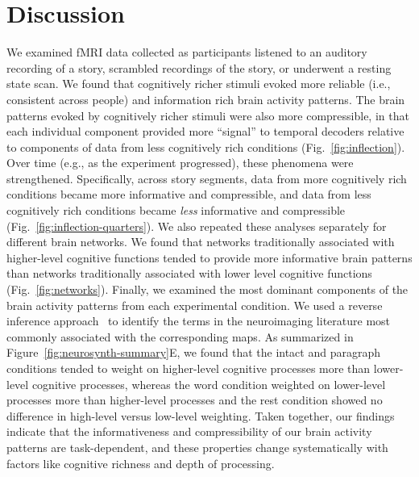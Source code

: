 \documentclass[english, 11pt]{article}
\begin{document}
\section*{Discussion}

We examined fMRI data collected as participants listened to an auditory
recording of a story, scrambled recordings of the story, or underwent a resting
state scan. We found that cognitively richer stimuli evoked more reliable
(i.e., consistent across people) and information rich brain activity patterns.
The brain patterns evoked by cognitively richer stimuli were also more
compressible, in that each individual component provided more ``signal'' to
temporal decoders relative to components of data from less cognitively rich
conditions (Fig.~\ref{fig:inflection}). Over time (e.g., as the experiment
progressed), these phenomena were strengthened. Specifically, across story
segments, data from more cognitively rich conditions became more informative
and compressible, and data from less cognitively rich conditions became
\textit{less} informative and compressible
(Fig.~\ref{fig:inflection-quarters}). We also repeated these analyses
separately for different brain networks. We found that networks traditionally
associated with higher-level cognitive functions tended to provide more
informative brain patterns than networks traditionally associated with lower
level cognitive functions (Fig.~\ref{fig:networks}). Finally, we examined the
most dominant components of the brain activity patterns from each experimental
condition. We used a reverse inference approach~\citep{RubiEtal17} to identify
the terms in the neuroimaging literature most commonly associated with the
corresponding maps. As summarized in Figure~\ref{fig:neurosynth-summary}E, we
found that the intact and paragraph conditions tended to weight on higher-level
cognitive processes more than lower-level cognitive processes, whereas the word
condition weighted on lower-level processes more than higher-level processes
and the rest condition showed no difference in high-level versus low-level
weighting. Taken together, our findings indicate that the informativeness and
compressibility of our brain activity patterns are task-dependent, and these
properties change systematically with factors like cognitive richness and depth
of processing.
\end{document}
